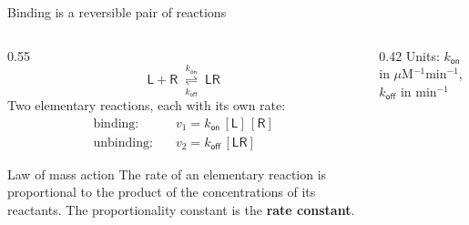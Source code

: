 \documentclass[aspectratio=169,10pt,t]{beamer}
\newcommand{\conc}[1]{[\mathsf{#1}]}
\begin{document}
\begin{frame}{Binding is a reversible pair of reactions}
  \begin{columns}[c]
    \begin{column}{0.55\textwidth}
      \[
        \mathsf{L} + \mathsf{R}
        \;\underset{k_\mathsf{off}}{\overset{k_\mathsf{on}}{\rightleftharpoons}}\;
        \mathsf{LR}
      \]
      \vskip1mm
      Two elementary reactions, each with its own rate:
      \begin{align*}
        \text{binding:}   &\quad v_1 = k_\mathsf{on}\,\conc{L}\,\conc{R} \\
        \text{unbinding:} &\quad v_2 = k_\mathsf{off}\,\conc{LR}
      \end{align*}
      \begin{block}{Law of mass action}
        \small The rate of an elementary reaction is proportional to the product of
        the concentrations of its reactants. The proportionality constant is the
        \textbf{rate constant}.
      \end{block}
    \end{column}
    \begin{column}{0.42\textwidth}
      \centering
      \vskip2mm
      {\scriptsize Units: $k_\mathsf{on}$ in $\mu$M$^{-1}$min$^{-1}$,
      $k_\mathsf{off}$ in min$^{-1}$}
    \end{column}
  \end{columns}
\end{frame}
\end{document}
